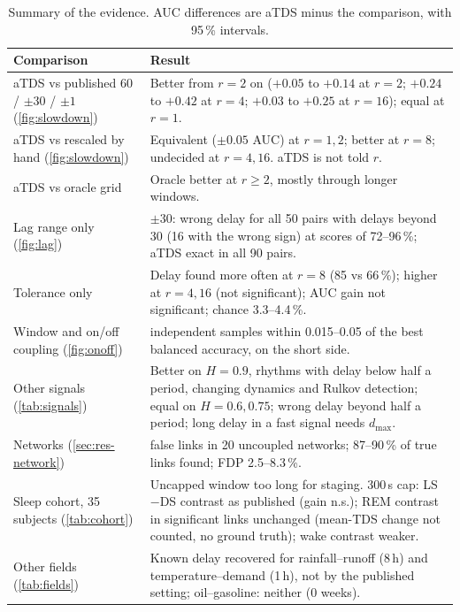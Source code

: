 \documentclass[11pt,a4paper]{article}
\begin{document}
\begin{table}[t]
\centering
\caption{Summary of the evidence. AUC differences are aTDS minus the comparison, with 95\,\% intervals.}
\label{tab:summary}
\footnotesize
\begin{tabularx}{\textwidth}{>{\raggedright\arraybackslash}p{4.2cm}>{\raggedright\arraybackslash}X}
\toprule
Comparison & Result \\
\midrule
aTDS vs published 60 / $\pm30$ / $\pm1$ (\cref{fig:slowdown}) & Better from $r = 2$ on ($+0.05$ to $+0.14$ at $r = 2$; $+0.24$ to $+0.42$ at $r = 4$; $+0.03$ to $+0.25$ at $r = 16$); equal at $r = 1$. \\
aTDS vs rescaled by hand (\cref{fig:slowdown}) & Equivalent ($\pm0.05$ AUC) at $r = 1, 2$; better at $r = 8$; undecided at $r = 4, 16$. aTDS is not told $r$. \\
aTDS vs oracle grid & Oracle better at $r \ge 2$, mostly through longer windows. \\
Lag range only (\cref{fig:lag}) & $\pm30$: wrong delay for all 50 pairs with delays beyond 30 (16 with the wrong sign) at scores of 72--96\,\%; aTDS exact in all 90 pairs. \\
Tolerance only & Delay found more often at $r = 8$ (85 vs 66\,\%); higher at $r = 4, 16$ (not significant); AUC gain not significant; chance 3.3--4.4\,\%. \\
Window and on/off coupling (\cref{fig:onoff}) & 30 independent samples within 0.015--0.05 of the best balanced accuracy, on the short side. \\
Other signals (\cref{tab:signals}) & Better on $H = 0.9$, rhythms with delay below half a period, changing dynamics and Rulkov detection; equal on $H = 0.6, 0.75$; wrong delay beyond half a period; long delay in a fast signal needs $d_{\max}$. \\
Networks (\cref{sec:res-network}) & 0 false links in 20 uncoupled networks; 87--90\,\% of true links found; FDP 2.5--8.3\,\%. \\
Sleep cohort, 35 subjects (\cref{tab:cohort}) & Uncapped window too long for staging. 300\,s cap: LS$-$DS contrast as published (gain n.s.); REM contrast in significant links unchanged (mean-TDS change not counted, no ground truth); wake contrast weaker. \\
Other fields (\cref{tab:fields}) & Known delay recovered for rainfall--runoff (8\,h) and temperature--demand (1\,h), not by the published setting; oil--gasoline: neither (0 weeks). \\
\bottomrule
\end{tabularx}
\end{table}
\end{document}

